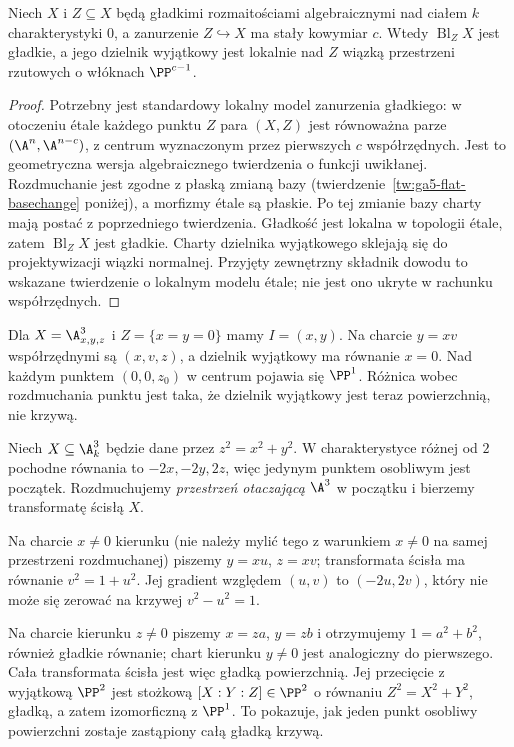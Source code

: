 \begin{wniosek}
\label{wn:ga5-smooth-center}
Niech $X$ i $Z\subseteq X$ będą gładkimi rozmaitościami
algebraicznymi nad ciałem $k$ charakterystyki $0$,
a zanurzenie $Z\hookrightarrow X$ ma stały kowymiar $c$.
Wtedy $\operatorname{Bl}_Z X$ jest gładkie, a jego
dzielnik wyjątkowy jest lokalnie nad $Z$ wiązką
przestrzeni rzutowych o włóknach $\PP^{c-1}$.
\end{wniosek}
\begin{proof}
Potrzebny jest standardowy lokalny model zanurzenia
gładkiego: w otoczeniu étale każdego punktu $Z$
para $(X,Z)$ jest równoważna parze
$(\A^n,\A^{n-c})$, z centrum wyznaczonym przez
pierwszych $c$ współrzędnych. Jest to geometryczna
wersja algebraicznego twierdzenia o funkcji uwikłanej.
Rozdmuchanie jest zgodne z płaską zmianą bazy
(twierdzenie~\ref{tw:ga5-flat-basechange} poniżej),
a morfizmy étale są płaskie. Po tej zmianie bazy
charty mają postać z poprzedniego twierdzenia.
Gładkość jest lokalna w topologii étale, zatem
$\operatorname{Bl}_Z X$ jest gładkie. Charty dzielnika
wyjątkowego sklejają się do projektywizacji wiązki
normalnej. Przyjęty zewnętrzny składnik dowodu to
wskazane twierdzenie o lokalnym modelu étale;
nie jest ono ukryte w rachunku współrzędnych.
\end{proof}

\begin{przyklad}
Dla $X=\A^3_{x,y,z}$ i $Z=\{x=y=0\}$
mamy $I=(x,y)$. Na charcie $y=xv$ współrzędnymi
są $(x,v,z)$, a dzielnik wyjątkowy ma równanie
$x=0$. Nad każdym punktem $(0,0,z_0)$ w centrum
pojawia się $\PP^1$. Różnica wobec rozdmuchania
punktu jest taka, że dzielnik wyjątkowy jest teraz
powierzchnią, nie krzywą.
\end{przyklad}

\begin{przyklad}
\label{prz:ga5-cone}
Niech $X\subseteq\A^3_k$ będzie dane przez
$z^2=x^2+y^2$. W charakterystyce różnej od $2$
pochodne równania to $-2x,-2y,2z$, więc jedynym
punktem osobliwym jest początek. Rozdmuchujemy
\emph{przestrzeń otaczającą} $\A^3$ w początku
i bierzemy transformatę ścisłą $X$.

Na charcie $x\ne0$ kierunku (nie należy mylić tego
z warunkiem $x\ne0$ na samej przestrzeni rozdmuchanej)
piszemy $y=xu$, $z=xv$; transformata ścisła ma
równanie $v^2=1+u^2$. Jej gradient względem
$(u,v)$ to $(-2u,2v)$, który nie może się zerować
na krzywej $v^2-u^2=1$.

Na charcie kierunku $z\ne0$ piszemy
$x=za$, $y=zb$ i otrzymujemy $1=a^2+b^2$,
również gładkie równanie; chart kierunku $y\ne0$
jest analogiczny do pierwszego. Cała transformata
ścisła jest więc gładką powierzchnią.
Jej przecięcie z wyjątkową $\PP^2$ jest stożkową
$[X:Y:Z]\in\PP^2$ o równaniu $Z^2=X^2+Y^2$,
gładką, a zatem izomorficzną z $\PP^1$.
To pokazuje, jak jeden punkt osobliwy powierzchni
zostaje zastąpiony całą gładką krzywą.
\end{przyklad}

